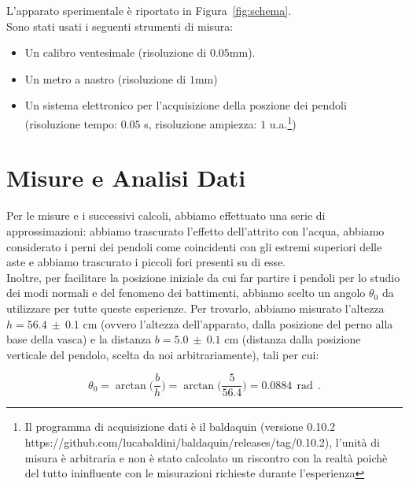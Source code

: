 \documentclass[a4paper,12pt]{article}
\begin{document}
L'apparato sperimentale è riportato in Figura~\ref{fig:schema}.\\

Sono stati usati i seguenti strumenti di misura:

\begin{itemize}
    \item Un calibro ventesimale (risoluzione di $0.05$mm).
    \item Un metro a nastro (risoluzione di $1$mm)
    \item Un sistema elettronico per l'acquisizione della poszione dei pendoli (risoluzione tempo: $0.05$ s, risoluzione ampiezza: $1$ u.a.\footnote{Il programma di acquisizione dati è il baldaquin (versione 0.10.2 https://github.com/lucabaldini/baldaquin/releases/tag/0.10.2), l'unità di misura è arbitraria e non è stato calcolato un riscontro con la realtà poichè del tutto ininfluente con le misurazioni richieste durante l'esperienza})
\end{itemize}

\section{Misure e Analisi Dati}

Per le misure e i successivi calcoli, abbiamo effettuato una serie di approssimazioni: abbiamo trascurato l'effetto dell'attrito con l'acqua, abbiamo considerato i perni dei pendoli come coincidenti con gli estremi superiori delle aste e abbiamo trascurato i piccoli fori presenti su di esse.\\
Inoltre, per facilitare la posizione iniziale da cui far partire i pendoli per lo studio dei modi normali e del fenomeno dei battimenti, abbiamo scelto un angolo $\theta_0$ da utilizzare per tutte queste esperienze. Per trovarlo, abbiamo misurato l'altezza $h = 56.4 \ \pm \ 0.1$ cm (ovvero l'altezza dell'apparato, dalla posizione del perno alla base della vasca) e la distanza $b = 5.0 \ \pm \ 0.1$ cm (distanza dalla posizione verticale del pendolo, scelta da noi arbitrariamente), tali per cui:

\begin{equation}
    \theta_0 = \arctan\bigg(\frac{b}{h}\bigg) = \arctan\bigg(\frac{5}{56.4}\bigg) = 0.0884 \ \ \mathrm{rad} \ \ .
\end{equation}

\end{document}
